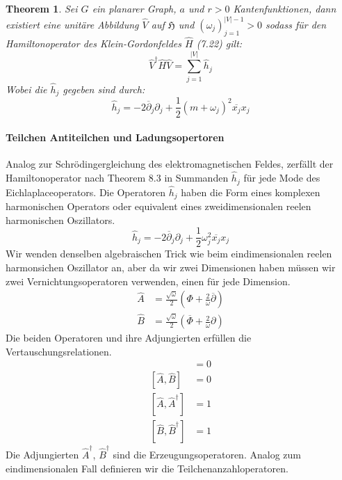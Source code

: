 \documentclass[11pt,a4paper,leqno]{report}
\newtheorem{theorem}{Theorem}[chapter]
\numberwithin{equation}{chapter}
\begin{document}
\noindent
\begin{theorem}
	Sei $G$ ein planarer Graph, $a$ und $r>0$ Kantenfunktionen, dann existiert eine unit\"are Abbildung $\hat{V}$ auf $\mathfrak{H}$ und $(\omega_j)_{j=1}^{|V|-1}>0$ sodass f\"ur den Hamiltonoperator des Klein-Gordonfeldes $\hat{H}$ (7.22) gilt:
	\begin{equation}
		\hat{V}^\dagger\hat{H}\hat{V}  = \sum_{j=1}^{|V|}\hat{h}_j
	\end{equation}
	Wobei die $\hat{h}_j$ gegeben sind durch:
	\begin{equation}
		\hat{h}_j= -2\overline{\partial}_j\partial_j + \frac{1}{2}(m + \omega_j)^2 \overline{x_j}x_j
	\end{equation}	
\end{theorem}
\paragraph{Teilchen Antiteilchen und Ladungsopertoren} Analog zur Schr\"odingergleichung des elektromagnetischen Feldes, zerf\"allt der Hamiltonoperator nach Theorem 8.3 in Summanden $\hat{h}_j$ f\"ur jede Mode des Eichlaplaceoperators. Die Operatoren  $\hat{h}_j$ haben die Form eines komplexen harmonischen Operators oder equivalent eines zweidimensionalen reelen harmonischen Oszillators.
\begin{equation}
	\hat{h}_j= -2\overline{\partial}_j\partial_j + \frac{1}{2}\omega_j^2 \overline{x_j}x_j
\end{equation}	
Wir wenden denselben algebraischen Trick wie beim eindimensionalen reelen harmonsichen Oszillator an, aber da wir zwei Dimensionen haben m\"ussen wir zwei Vernichtungsoperatoren verwenden, einen f\"ur jede Dimension.\\
\begin{align*}
	\hat{A} &= \frac{\sqrt{\omega}}{2}(\Phi + \frac{2}{\omega}\overline{\partial})\\
	\hat{B} &= \frac{\sqrt{\omega}}{2}(\overline{\Phi} + \frac{2}{\omega}\partial)
\end{align*}
Die beiden Operatoren und ihre Adjungierten erf\"ullen die Vertauschungsrelationen.
\begin{align*}
	[\hat{A}, \hat{B}^\dagger] &= 0\\
	[\hat{A}, \hat{B}] &= 0\\
	[\hat{A}, \hat{A}^\dagger] &= 1\\
	[\hat{B}, \hat{B}^\dagger] &= 1
\end{align*}
Die Adjungierten $\hat{A}^\dagger$, $\hat{B}^\dagger$ sind die Erzeugungsoperatoren. Analog zum eindimensionalen Fall definieren wir die Teilchenanzahloperatoren.
\end{document}
